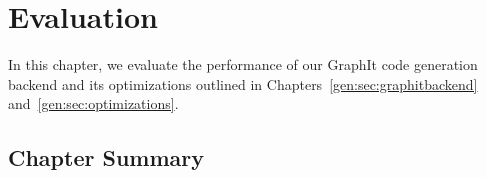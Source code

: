 \chapter{Evaluation}\label{sec:eval}

In this chapter, we evaluate the performance of our GraphIt code generation backend and its optimizations outlined in Chapters~\ref{gen:sec:graphitbackend} and~\ref{gen:sec:optimizations}.




\section{Chapter Summary}